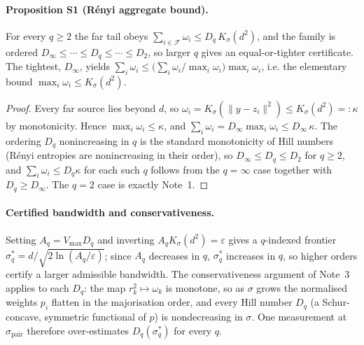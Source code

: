 \documentclass[10pt,twocolumn]{article}
\newcommand{\sstar}{\sigma^{*}}
\begin{document}
\paragraph{Proposition S1 (R\'enyi aggregate bound).} For every $q\ge2$ the far tail obeys $\sum_{i\in\mathcal{F}}\omega_i\le D_q\,K_\sigma(d^2)$, and the family is ordered $D_\infty\le\cdots\le D_q\le\cdots\le D_2$, so larger $q$ gives an equal-or-tighter certificate. The tightest, $D_\infty$, yields $\sum_i\omega_i\le \big(\sum_i\omega_i/\max_i\omega_i\big)\max_i\omega_i$, i.e. the elementary bound $\max_i\omega_i\le K_\sigma(d^2)$.
\begin{proof}
Every far source lies beyond $d$, so $\omega_i=K_\sigma(\lVert y-z_i\rVert^2)\le K_\sigma(d^2)=:\kappa$ by monotonicity. Hence $\max_i\omega_i\le\kappa$, and $\sum_i\omega_i=D_\infty\max_i\omega_i\le D_\infty\,\kappa$. The ordering $D_q$ nonincreasing in $q$ is the standard monotonicity of Hill numbers (R\'enyi entropies are nonincreasing in their order), so $D_\infty\le D_q\le D_2$ for $q\ge2$, and $\sum_i\omega_i\le D_q\kappa$ for each such $q$ follows from the $q=\infty$ case together with $D_q\ge D_\infty$. The $q=2$ case is exactly Note~1.
\end{proof}
\paragraph{Certified bandwidth and conservativeness.} Setting $A_q=V_{\max}D_q$ and inverting $A_q K_\sigma(d^2)=\varepsilon$ gives a $q$-indexed frontier $\sstar_q=d/\sqrt{2\ln(A_q/\varepsilon)}$; since $A_q$ decreases in $q$, $\sstar_q$ increases in $q$, so higher orders certify a larger admissible bandwidth. The conservativeness argument of Note~3 applies to each $D_q$: the map $r_k^2\mapsto\omega_k$ is monotone, so as $\sigma$ grows the normalised weights $p_i$ flatten in the majorisation order, and every Hill number $D_q$ (a Schur-concave, symmetric functional of $p$) is nondecreasing in $\sigma$. One measurement at $\sigma_{\mathrm{pair}}$ therefore over-estimates $D_q(\sstar_q)$ for every $q$.
\end{document}
